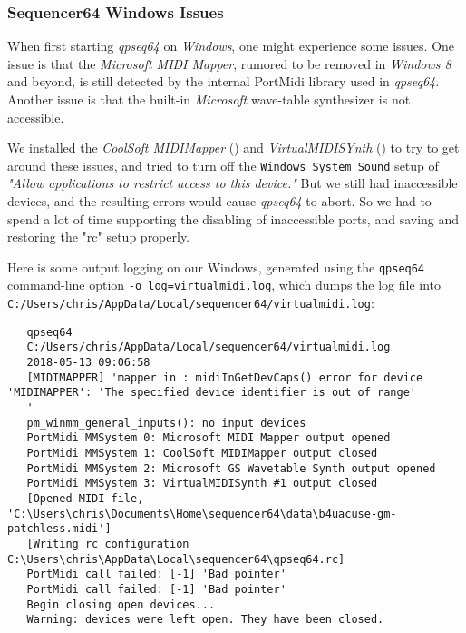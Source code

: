 \subsubsection{Sequencer64 Windows Issues}
\label{subsubsec:qt_portmidi_windows_setup_issues}

    When first starting \textsl{qpseq64} on \textsl{Windows}, one might
    experience some issues.  One issue is that the \textsl{Microsoft MIDI
    Mapper}, rumored to be removed in \textsl{Windows 8} and beyond, is still
    detected by the internal PortMidi library used in \textsl{qpseq64}.
    Another issue is that the built-in \textsl{Microsoft} wave-table
    synthesizer is not accessible.

    We installed the
    \textsl{CoolSoft MIDIMapper} (\cite{midimapper}) and
    \textsl{VirtualMIDISYnth} (\cite{midisynth}) to try to get
    around these issues, and tried to turn off the
    \texttt{Windows System Sound} setup of
    \textsl{"Allow applications to restrict access to this device."}
    But we still had
    inaccessible devices, and the resulting errors would cause
    \textsl{qpseq64} to
    abort.  So we had to spend a lot of time supporting the disabling of
    inaccessible ports, and saving and restoring the "rc" setup properly.

    Here is some output logging on our Windows, generated using the
    \texttt{qpseq64} command-line option
    \texttt{-o log=virtualmidi.log},
    which dumps the log file into
    \texttt{C:/Users/chris/AppData/Local/sequencer64/virtualmidi.log}:

\begin{verbatim}
   qpseq64 
   C:/Users/chris/AppData/Local/sequencer64/virtualmidi.log 
   2018-05-13 09:06:58 
   [MIDIMAPPER] 'mapper in : midiInGetDevCaps() error for device 'MIDIMAPPER': 'The specified device identifier is out of range'
   '
   pm_winmm_general_inputs(): no input devices
   PortMidi MMSystem 0: Microsoft MIDI Mapper output opened
   PortMidi MMSystem 1: CoolSoft MIDIMapper output closed
   PortMidi MMSystem 2: Microsoft GS Wavetable Synth output opened
   PortMidi MMSystem 3: VirtualMIDISynth #1 output closed
   [Opened MIDI file, 'C:\Users\chris\Documents\Home\sequencer64\data\b4uacuse-gm-patchless.midi']
   [Writing rc configuration C:\Users\chris\AppData\Local\sequencer64\qpseq64.rc]
   PortMidi call failed: [-1] 'Bad pointer'
   PortMidi call failed: [-1] 'Bad pointer'
   Begin closing open devices...
   Warning: devices were left open. They have been closed.
\end{verbatim}


